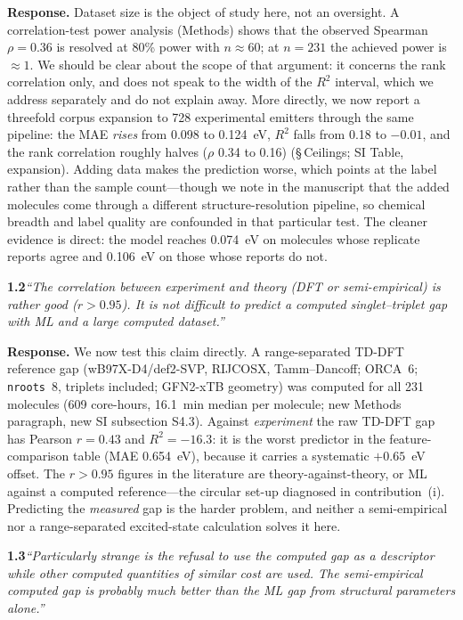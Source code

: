 \documentclass[12pt,a4paper]{letter}
\begin{document}
\smallskip
\noindent\textbf{Response.}
Dataset size is the object of study here, not an oversight. A correlation-test
power analysis (Methods) shows that the observed Spearman $\rho = 0.36$ is
resolved at \num{80}\% power with $n \approx 60$; at $n = 231$ the achieved power
is $\approx 1$. We should be clear about the scope of that argument: it concerns the rank
correlation only, and does not speak to the width of the $R^2$ interval, which we address
separately and do not explain away.
More directly, we now report a threefold corpus expansion to \num{728}
experimental emitters through the same pipeline: the MAE \emph{rises} from
\num{0.098} to \num{0.124}~eV, $R^2$ falls from \num{0.18} to $-0.01$, and the
rank correlation roughly halves ($\rho$ \num{0.34} to \num{0.16})
(\S\,Ceilings; SI Table, expansion). Adding data makes the prediction worse, which
points at the label rather than the sample count---though we note in the manuscript that
the added molecules come through a different structure-resolution pipeline, so chemical
breadth and label quality are confounded in that particular test. The cleaner evidence is
direct: the model reaches \num{0.074}~eV on molecules whose replicate reports agree and
\num{0.106}~eV on those whose reports do not.

\medskip
\noindent\textbf{1.2}\quad\textit{``The correlation between experiment and theory
(DFT or semi-empirical) is rather good ($r > 0.95$). It is not difficult to
predict a computed singlet--triplet gap with ML and a large computed dataset.''}

\smallskip
\noindent\textbf{Response.}
We now test this claim directly. A range-separated TD-DFT reference gap
(wB97X-D4/def2-SVP, RIJCOSX, Tamm--Dancoff; ORCA~6; \texttt{nroots}~8, triplets
included; GFN2-xTB geometry) was computed for all \num{231} molecules
(\num{609} core-hours, \num{16.1}~min median per molecule; new Methods paragraph,
new SI subsection S4.3). Against \emph{experiment} the raw TD-DFT gap has Pearson
$r = 0.43$ and $R^2 = -16.3$: it is the worst predictor in the feature-comparison
table (MAE \num{0.654}~eV), because it carries a systematic $+\num{0.65}$~eV offset. The $r > 0.95$ figures in the
literature are theory-against-theory, or ML against a computed reference---the
circular set-up diagnosed in contribution~(i). Predicting the \emph{measured} gap
is the harder problem, and neither a semi-empirical nor a range-separated
excited-state calculation solves it here.

\medskip
\noindent\textbf{1.3}\quad\textit{``Particularly strange is the refusal to use the
computed gap as a descriptor while other computed quantities of similar cost are
used. The semi-empirical computed gap is probably much better than the ML gap
from structural parameters alone.''}
\end{document}
